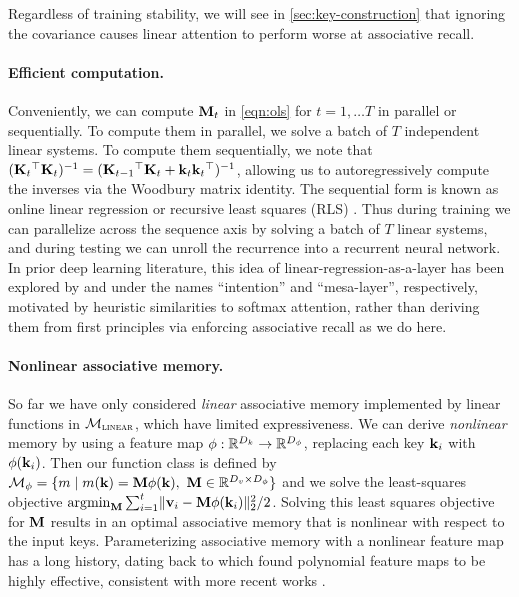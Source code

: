 \documentclass[notitlepage, 11pt]{article}
\newcommand*{\memory}{{m}}
\newcommand*{\dkey}{{D_k}}
\newcommand*{\dphi}{{D_\phi}}
\newcommand*{\dval}{{D_v}}
\newcommand*{\linearfunctions}{{\Mcal_{\textsc{linear}}}}
\begin{document}
Regardless of training stability, we will see in \autoref{sec:key-construction} that ignoring the covariance causes linear attention to perform worse at associative recall.




\paragraph{Efficient computation.}
Conveniently, we can compute $\mathbf{M}_t$ in \autoref{eqn:ols} for $t=1, \ldots T$ in parallel or sequentially.
To compute them in parallel, we solve a batch of $T$ independent linear systems.
To compute them sequentially, we note that $(\mathbf{K}_t{}^\top\mathbf{K}_t)^{-1} = (\mathbf{K}_{t-1}{}^\top \mathbf{K}_t + \mathbf{k}_t\mathbf{k}_t{}^\top)^{-1}$, allowing us to autoregressively compute the inverses via the Woodbury matrix identity.
The sequential form is known as online linear regression or recursive least squares (RLS) \citep{Haykin2014AdaptiveFilterTheory}. %
Thus during training we can parallelize across the sequence axis by solving a batch of $T$ linear systems, and during testing we can unroll the recurrence into a recurrent neural network.
In prior deep learning literature, this idea of linear-regression-as-a-layer has been explored by \citet{Garnelo2023ExploringSpaceKeyValueQuery} and \citet{vonOswald2023UncoveringMesaoptimizationAlgorithms} under the names ``intention'' and ``mesa-layer'', respectively, motivated by heuristic similarities to softmax attention, rather than deriving them from first principles via enforcing associative recall as we do here. %

\paragraph{Nonlinear associative memory.}
So far we have only considered \emph{linear} associative memory implemented by linear functions in $\linearfunctions$, which have limited expressiveness.
We can derive \emph{nonlinear} memory by using a feature map $\phi: \reals^\dkey \to \reals^\dphi$, replacing each key $\mathbf{k}_i$ with $\phi(\mathbf{k}_i)$.
Then our function class is defined by $\Mcal_{\phi} = \{\memory \mid \memory(\kbf) = \Mbf\phi(\kbf),\ \Mbf \in \reals^{\dval\times\dphi}\}$ and we solve the least-squares objective $\operatorname*{\arg\!\min}_{\mathbf{M}} \sum_{i=1}^t\lVert\mathbf{v}_i - \mathbf{M} \phi(\mathbf{k}_i)\rVert_2^2/2$.
Solving this least squares objective for $\mathbf{M}$ results in an optimal associative memory that is nonlinear with respect to the input keys.
Parameterizing associative memory with a nonlinear feature map has a long history, dating back to \citet{Poggio1975OptimalNonlinearAssociative} which found polynomial feature maps to be highly effective, consistent with more recent works \citep{Zhang2023HedgehogPorcupineExpressive,Arora2024SimpleLinearAttention}.
\end{document}
